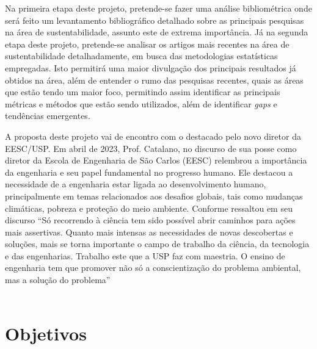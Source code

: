 \documentclass{article}[12pt]
\begin{document}
Na primeira etapa deste projeto, pretende-se fazer uma análise bibliométrica onde será feito um
levantamento bibliográfico detalhado sobre as principais pesquisas na área de sustentabilidade,
assunto este de extrema importância. Já na segunda etapa deste projeto, pretende-se analisar os
artigos mais recentes na área de sustentabilidade detalhadamente, em busca das metodologias
estatísticas empregadas. Isto permitirá uma maior divulgação dos principais resultados já obtidos na
área, além de entender o rumo das pesquisas recentes, quais as áreas que estão tendo um maior foco,
permitindo assim identificar as principais métricas e métodos que estão sendo utilizados, além de
identificar \textit{gaps} e tendências emergentes. \par








A proposta deste projeto vai de encontro com o destacado pelo novo diretor da EESC/USP. Em abril de
2023, Prof. Catalano, no discurso de sua posse como diretor da Escola de Engenharia de São Carlos
(EESC) relembrou a importância da engenharia e seu papel fundamental no progresso humano. Ele
destacou a necessidade de a engenharia estar ligada ao desenvolvimento humano, principalmente em
temas relacionados aos desafios globais, tais como mudanças climáticas, pobreza e proteção do meio
ambiente. Conforme ressaltou em seu discurso ``Só recorrendo à ciência tem sido possível abrir
caminhos para ações mais assertivas. Quanto mais intensas as necessidades de novas descobertas e
soluções, mais se torna importante o campo de trabalho da ciência, da tecnologia e das engenharias.
Trabalho este que a USP faz com maestria. O ensino de engenharia tem que promover não só a
conscientização do problema ambiental, mas a solução do problema'' \cite{Cruz2023} \\ \\



\section{Objetivos}
\end{document}
